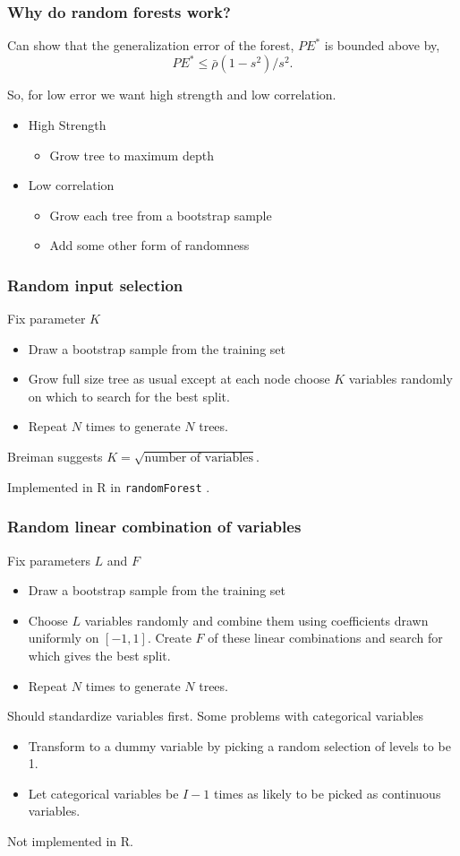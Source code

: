 \documentclass{beamer}
\begin{document}
\begin{frame}
	\frametitle{Why do random forests work?}
	Can show that the generalization error of the forest, $PE^*$ is bounded above by,
	\[
	PE^* \le \bar{\rho}(1-s^2)/s^2.
	\]
	
	So, for low error we want high strength and low correlation.
	
	\begin{itemize}
		\item High Strength
			\begin{itemize}
				\item Grow tree to maximum depth
			\end{itemize}
		\item Low correlation
		\begin{itemize}
			\item Grow each tree from a bootstrap sample
			\item Add some other form of randomness 
		\end{itemize}
	\end{itemize}
	
\end{frame}

\begin{frame}[fragile]
	\frametitle{Random input selection}
	Fix parameter $K$
	\begin{itemize}
		\item Draw a bootstrap sample from the training set
		\item Grow full size tree as usual except at each node choose $K$ variables randomly on which to search for the best split.
		\item Repeat $N$ times to generate $N$ trees.
	\end{itemize}
	Breiman suggests $K=\sqrt{\text{number of variables}}$.

	Implemented in R in \verb|randomForest| .
	
\end{frame}

\begin{frame}
	\frametitle{Random linear combination of variables}
	Fix parameters $L$ and $F$
	\begin{itemize}
		\item Draw a bootstrap sample from the training set
		\item Choose $L$ variables randomly and combine them using coefficients drawn uniformly on $[-1,1]$. Create $F$ of these linear combinations and search for which gives the best split.
		\item Repeat $N$ times to generate $N$ trees.
	\end{itemize}
	Should standardize variables first.
	Some problems with categorical variables
	\begin{itemize}
		\item Transform to a dummy variable by picking a random selection of levels to be 1.
		\item Let categorical variables be $I-1$ times as likely to be picked as continuous variables.
	\end{itemize}
	Not implemented in R.
\end{frame}
\end{document}

